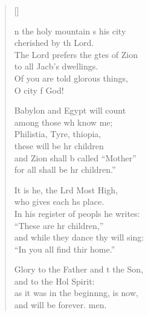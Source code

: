 \settowidth{\versewidth}{In his register of peoples he writes: *}
\begin{verse}[\versewidth]
  \begin{patverse}
n the holy mountain \pointup{\i}s his city\Med\\
cherished by th Lord.\\
The Lord prefers the gtes of Zion\Med\\
to all Jacb’s dwellings.\\
Of you are told glor\pointup{\i}ous things,\Med\\
O city f God!

Babylon and Egypt  will count\Med\\
among those wh know me;\\
Philistia, Tyre, thiopia,\Med\\
these will be hr children\\
and Zion shall b called “Mother”\Med\\
for all shall be hr children.”

It is he, the Lrd Most High,\Med\\
who gives each h\pointup{\i}s place.\\
In his register of peopls he writes:\Med\\
“These are hr children,”\\
and while they dance thy will sing:\Med\\
“In you all find thir home.”

Glory to the Father and t the Son,\Med\\
and to the Hol Spirit:\\
as it was in the beginn\pointup{\i}ng, is now,\Med\\
and will be forever. men.
  \end{patverse}
\end{verse}
